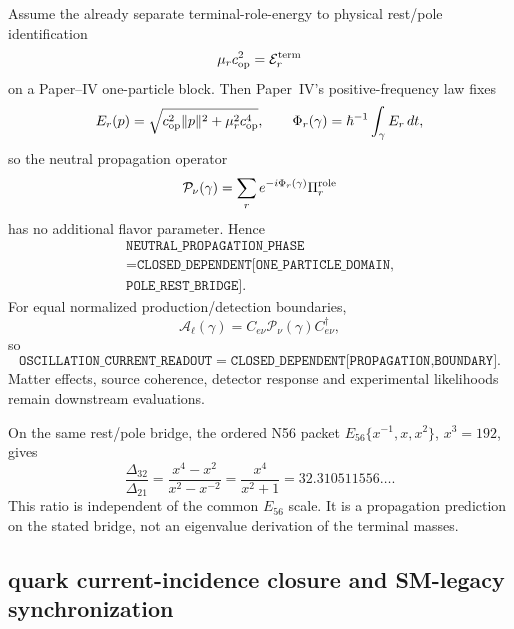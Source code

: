 \documentclass[12pt,a4paper]{article}
\begin{document}
\begin{theorem}
\label{p7v2:thm:v267-neutral-propagation-phase}
Assume the already separate terminal-role-energy to physical rest/pole
identification
\[
 \mu_r c_{\rm op}^2=\mathcal E_r^{\rm term}
\]
on a Paper--IV one-particle block.  Then Paper~IV's positive-frequency law
fixes
\[
 E_r(p)=\sqrt{c_{\rm op}^2\|p\|^2+\mu_r^2c_{\rm op}^4},
 \qquad
 \Phi_r(\gamma)=\hbar^{-1}\int_\gamma E_r\,dt,
\]
so the neutral propagation operator
\[
 \mathcal P_\nu(\gamma)
 =\sum_r e^{-i\Phi_r(\gamma)}\Pi_r^{\rm role}
\]
has no additional flavor parameter.  Hence
\[
 \boxed{\begin{gathered}
 \texttt{NEUTRAL\_PROPAGATION\_PHASE}\\
 =\texttt{CLOSED\_DEPENDENT[ONE\_PARTICLE\_DOMAIN,}\\
 \texttt{POLE\_REST\_BRIDGE]}.
 \end{gathered}}
\]
For equal normalized production/detection boundaries,
\[
 \mathcal A_\ell(\gamma)
 =C_{e\nu}\mathcal P_\nu(\gamma)C_{e\nu}^\dagger,
\]
so
\[
 \boxed{
 \texttt{OSCILLATION\_CURRENT\_READOUT}
 =\texttt{CLOSED\_DEPENDENT[PROPAGATION,BOUNDARY]}.}
\]
Matter effects, source coherence, detector response and experimental
likelihoods remain downstream evaluations.
\end{theorem}

\begin{corollary}
\label{p7v2:cor:v267-n56-gap-ratio}
On the same rest/pole bridge, the ordered N56 packet
\(E_{56}\{x^{-1},x,x^2\}\), $x^3=192$, gives
\[
 \boxed{
 \frac{\Delta_{32}}{\Delta_{21}}
 =\frac{x^4-x^2}{x^2-x^{-2}}
 =\frac{x^4}{x^2+1}
 =32.310511556\ldots .}
\]
This ratio is independent of the common $E_{56}$ scale.  It is a propagation
prediction on the stated bridge, not an eigenvalue derivation of the terminal
masses.
\end{corollary}


\subsection{quark current-incidence closure and SM-legacy synchronization}
\label{p7v2:sec:v268-quark-current-incidence-closure}
\end{document}
